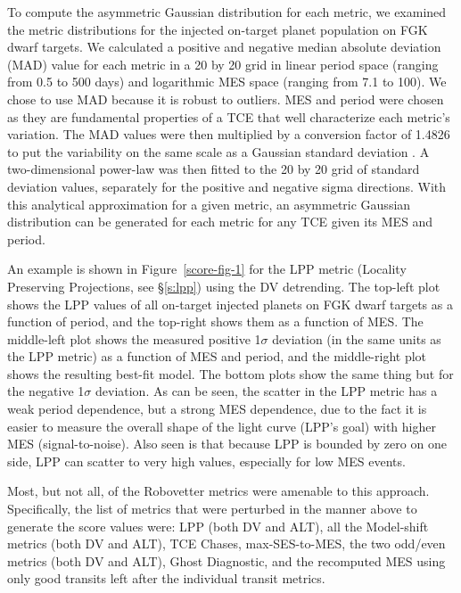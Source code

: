 To compute the asymmetric Gaussian distribution for each metric, we examined the metric distributions for the injected on-target planet population on FGK dwarf targets. We calculated a positive and negative median absolute deviation (MAD) value for each metric in a 20 by 20 grid in linear period space (ranging from 0.5 to 500 days) and logarithmic MES space (ranging from 7.1 to 100). We chose to use MAD because it is robust to outliers. MES and period were chosen as they are fundamental properties of a TCE that well characterize each metric's variation. The MAD values were then multiplied by a conversion factor of 1.4826 to put the variability on the same scale as a Gaussian standard deviation \citep{Hampel1974,Ruppert2010}. A two-dimensional power-law was then fitted to the 20 by 20 grid of standard deviation values, separately for the positive and negative sigma directions. With this analytical approximation for a given metric, an asymmetric Gaussian distribution can be generated for each metric for any TCE given its MES and period.

An example is shown in Figure~\ref{score-fig-1} for the LPP metric (Locality Preserving Projections, see \S\ref{s:lpp}) using the DV detrending. The top-left plot shows the LPP values of all on-target injected planets on FGK dwarf targets as a function of period, and the top-right shows them as a function of MES. The middle-left plot shows the measured positive 1$\sigma$ deviation (in the same units as the LPP metric) as a function of MES and period, and the middle-right plot shows the resulting best-fit model. The bottom plots show the same thing but for the negative 1$\sigma$ deviation. As can be seen, the scatter in the LPP metric has a weak period dependence, but a strong MES dependence, due to the fact it is easier to measure the overall shape of the light curve (LPP's goal) with higher MES (signal-to-noise). Also seen is that because LPP is bounded by zero on one side, LPP can scatter to very high values, especially for low MES events. 

Most, but not all, of the Robovetter metrics were amenable to this approach. Specifically, the list of metrics that were perturbed in the manner above to generate the score values were: LPP (both DV and ALT), all the Model-shift metrics (both DV and ALT), TCE Chases, max-SES-to-MES, the two odd/even metrics (both DV and ALT), Ghost Diagnostic, and the recomputed MES using only good transits left after the individual transit metrics.

